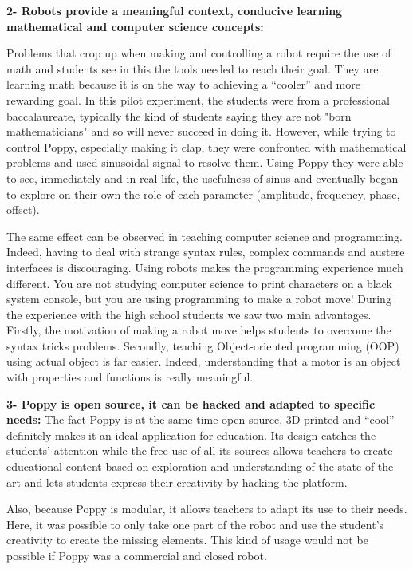 \textbf{2- Robots provide a meaningful context, conducive learning mathematical and computer science concepts:}

Problems that crop up when making and controlling a robot require the use of math and students see in this the tools needed to reach their goal. They are learning math because it is on the way to achieving a “cooler” and more rewarding goal. In this pilot experiment, the students were from a professional baccalaureate, typically the kind of students saying they are not "born mathematicians" and so will never succeed in doing it. However, while trying to control Poppy, especially making it clap, they were confronted with mathematical problems and used sinusoidal signal to resolve them. Using Poppy they were able to see, immediately and in real life, the usefulness of sinus and eventually began to explore on their own the role of each parameter (amplitude, frequency, phase, offset).

The same effect can be observed in teaching computer science and programming. Indeed, having to deal with strange syntax rules, complex commands and austere interfaces is discouraging. Using robots makes the programming experience much different. You are not studying computer science to print characters on a black system console, but you are using programming to make a robot move!
During the experience with the high school students we saw two main advantages. Firstly, the motivation of making a robot move helps students to overcome the syntax tricks problems. Secondly, teaching Object-oriented programming (OOP) using actual object is far easier. Indeed, understanding that a motor is an object with properties and functions is really meaningful.


\textbf{3- Poppy is open source, it can be hacked and adapted to specific needs:}
The fact Poppy is at the same time open source, 3D printed and “cool” definitely makes it  an ideal application for education. Its design catches the students’ attention while the free use of all its sources allows teachers to create educational content based on exploration and understanding of the state of the art and lets students express their creativity by hacking the platform.


Also, because Poppy is modular, it allows teachers to adapt its use to their needs. Here, it was possible to only take one part of the robot and use the student’s creativity to create the missing elements. This kind of usage would not be possible if Poppy was a commercial and closed robot.

